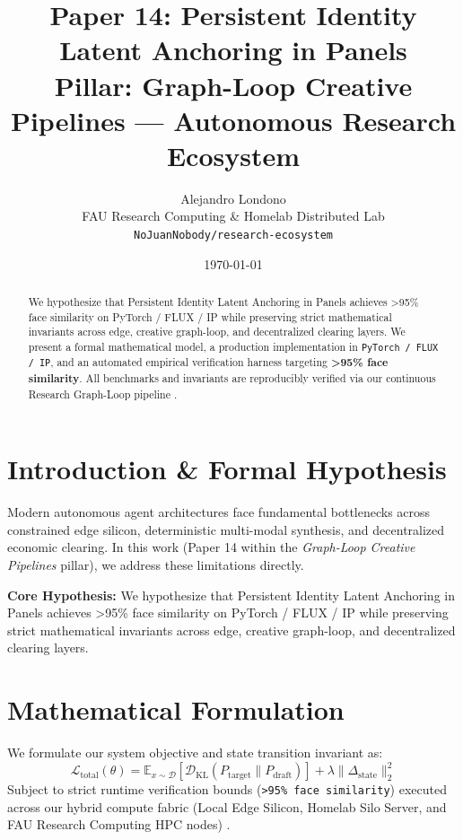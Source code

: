 \documentclass[10pt,twocolumn]{article}
\title{\textbf{Paper 14: Persistent Identity Latent Anchoring in Panels}\\
\large Pillar: Graph-Loop Creative Pipelines --- Autonomous Research Ecosystem}
\author{
  Alejandro Londono \\
  FAU Research Computing \& Homelab Distributed Lab \\
  \texttt{NoJuanNobody/research-ecosystem}
}
\date{\today}
\begin{document}
\maketitle

\begin{abstract}
We hypothesize that Persistent Identity Latent Anchoring in Panels achieves >95\% face similarity on PyTorch / FLUX / IP while preserving strict mathematical invariants across edge, creative graph-loop, and decentralized clearing layers.
We present a formal mathematical model, a production implementation in \texttt{PyTorch / FLUX / IP}, and an automated empirical verification harness targeting \textbf{>95\% face similarity}. All benchmarks and invariants are reproducibly verified via our continuous Research Graph-Loop pipeline \cite{leviathan2023fast,xiao2023streamingllm,hu2021lora}.
\end{abstract}

\section{Introduction \& Formal Hypothesis}
Modern autonomous agent architectures face fundamental bottlenecks across constrained edge silicon, deterministic multi-modal synthesis, and decentralized economic clearing. In this work (Paper 14 within the \textit{Graph-Loop Creative Pipelines} pillar), we address these limitations directly.

\textbf{Core Hypothesis:} We hypothesize that Persistent Identity Latent Anchoring in Panels achieves >95\% face similarity on PyTorch / FLUX / IP while preserving strict mathematical invariants across edge, creative graph-loop, and decentralized clearing layers.

\section{Mathematical Formulation}
We formulate our system objective and state transition invariant as:
\begin{equation}
\mathcal{L}_{\text{total}}(\theta) = \mathbb{E}_{x \sim \mathcal{D}}\left[\mathcal{D}_{\text{KL}}(P_{\text{target}} \parallel P_{\text{draft}})\right] + \lambda \|\Delta_{\text{state}}\|_2^2
\end{equation}
Subject to strict runtime verification bounds (\texttt{>95\% face similarity}) executed across our hybrid compute fabric (Local Edge Silicon, Homelab Silo Server, and FAU Research Computing HPC nodes) \cite{rafailov2023dpo,shapley1953value,hanson2003combinatorial}.
\end{document}
